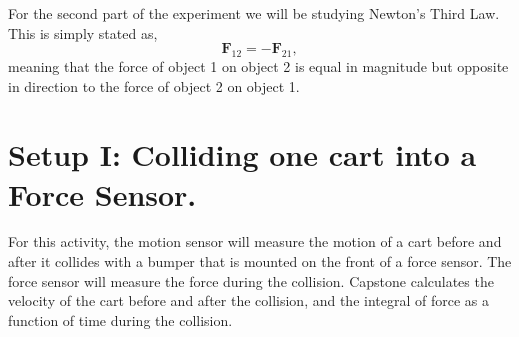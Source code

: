 \documentclass[main.tex]{subfiles}
\begin{document}
For the second part of the experiment we will be studying Newton's Third Law. This is simply stated as,
\begin{equation}
\mathbf{F}_{12}=-\mathbf{F}_{21},
\end{equation}
meaning that the force of object 1 on object 2 is equal in magnitude but opposite in direction to the force of object 2 on object 1.

\section{Setup I: Colliding one cart into a Force Sensor.}
For this activity, the motion sensor will measure the motion of a cart before and after it collides with a bumper that is mounted on the front of a force sensor. The force sensor will measure the force during the collision. Capstone calculates the velocity of the cart before and after the collision, and the integral of force as a function of time during the collision.
\end{document}
